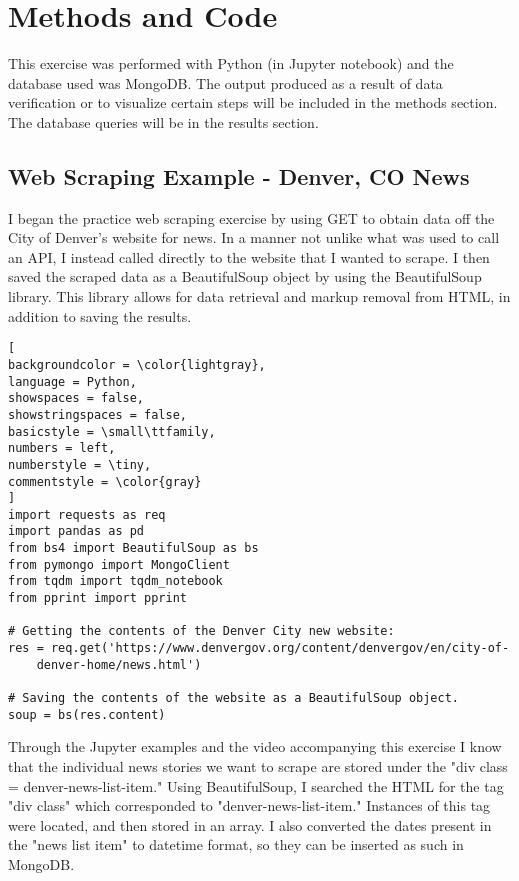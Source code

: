 \documentclass[]{article}
\begin{document}
\section{Methods and Code}
This exercise was performed with Python (in Jupyter notebook) and the database used was MongoDB.  The output produced as a result of data verification or to visualize certain steps will be included in the methods section.  The database queries will be in the results section.
\subsection{Web Scraping Example - Denver, CO News}
I began the practice web scraping exercise by using GET to obtain data off the City of Denver's website for news. In a manner not unlike what was used to call an API, I instead called directly to the website that I wanted to scrape.  I then saved the scraped data as a BeautifulSoup object by using the BeautifulSoup library.  This library allows for data retrieval and markup removal from HTML, in addition to saving the results.
\begin{lstlisting}[
backgroundcolor = \color{lightgray},
language = Python,
showspaces = false,
showstringspaces = false,
basicstyle = \small\ttfamily,
numbers = left,
numberstyle = \tiny,
commentstyle = \color{gray}
]
import requests as req
import pandas as pd
from bs4 import BeautifulSoup as bs
from pymongo import MongoClient
from tqdm import tqdm_notebook
from pprint import pprint

# Getting the contents of the Denver City new website:
res = req.get('https://www.denvergov.org/content/denvergov/en/city-of-
	denver-home/news.html')

# Saving the contents of the website as a BeautifulSoup object.
soup = bs(res.content)
\end{lstlisting}

Through the Jupyter examples and the video accompanying this exercise I know that the individual news stories we want to scrape are stored under the "div class = denver-news-list-item." Using BeautifulSoup, I searched the HTML for the tag "div class" which corresponded to "denver-news-list-item."  Instances of this tag were located, and then stored in an array.  I also converted the dates present in the "news list item" to datetime format, so they can be inserted as such in MongoDB.
\end{document}
